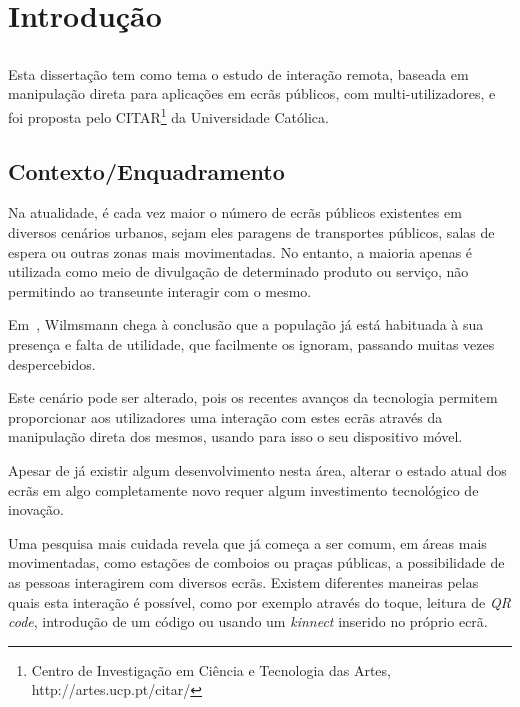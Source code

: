 \chapter{Introdução} \label{chap:intro}

\section*{}
 
Esta dissertação tem como tema o estudo de interação remota, baseada em manipulação direta para aplicações em ecrãs públicos, com multi-utilizadores, e foi proposta pelo CITAR\footnote{Centro de Investigação em Ciência e Tecnologia das Artes, http://artes.ucp.pt/citar/} da Universidade Católica.  

\section{Contexto/Enquadramento} \label{sec:context}

Na atualidade, é cada vez maior o número de ecrãs públicos existentes em diversos cenários urbanos, sejam eles paragens de transportes públicos, salas de espera ou outras zonas mais movimentadas. No entanto, a maioria apenas é utilizada como meio de divulgação de determinado produto ou serviço, não permitindo ao transeunte interagir com o mesmo. 

Em~\cite{Wilmsmann}, Wilmsmann chega à conclusão que a população já está habituada à sua presença e falta de utilidade, que facilmente os ignoram, passando muitas vezes despercebidos. 

Este cenário pode ser alterado, pois os recentes avanços da tecnologia permitem proporcionar aos utilizadores uma interação com estes ecrãs através da manipulação direta dos mesmos, usando para isso o seu dispositivo móvel.

Apesar de já existir algum desenvolvimento nesta área, alterar o estado atual dos ecrãs em algo completamente novo requer algum investimento tecnológico de inovação.

Uma pesquisa mais cuidada revela que já começa a ser comum, em áreas mais movimentadas, como estações de comboios ou praças públicas, a possibilidade de as pessoas interagirem com diversos ecrãs. Existem diferentes maneiras pelas quais esta interação é possível, como por exemplo através do toque, leitura de \textit{QR code}, introdução de um código ou usando um \textit{kinnect} inserido no próprio ecrã. 

